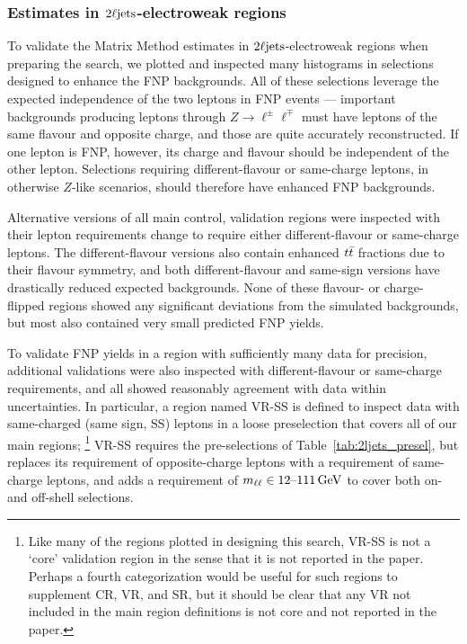 \subsubsection{%
Estimates in \texorpdfstring{$\twoljets$}{2Ljets}-electroweak regions%
}
\label{sec:2ljets_matrix_method_ewk}
To validate the Matrix Method estimates in $\twoljets$-electroweak regions
when preparing the search, we plotted and inspected many histograms in
selections designed to enhance the FNP backgrounds.
All of these selections leverage the expected independence of the two leptons
in FNP events --- important backgrounds producing leptons through
$Z\to \ell^\pm\ell^\mp$ must have leptons of the same flavour and
opposite charge, and those are quite accurately reconstructed.
If one lepton is FNP, however, its charge and flavour should be
independent of the other lepton.
Selections requiring different-flavour or same-charge leptons,
in otherwise $Z$-like scenarios, should therefore have enhanced FNP
backgrounds.

Alternative versions of all main control, validation regions were inspected
with their lepton requirements change to require either different-flavour
or same-charge leptons.
The different-flavour versions also contain enhanced $\ttbar$ fractions
due to their flavour symmetry,
and both different-flavour and same-sign versions have drastically reduced
expected backgrounds.
None of these flavour- or charge- flipped regions showed any significant
deviations from the simulated backgrounds, but most also contained very small
predicted FNP yields.

To validate FNP yields in a region with sufficiently many data for precision,
additional validations were also inspected with different-flavour or
same-charge requirements, and all showed reasonably agreement with data
within uncertainties.
In particular, a region named VR-SS is defined to inspect data with
same-charged (same sign, SS) leptons in a loose preselection that covers all
of our main regions;%
\footnote{%
Like many of the regions plotted in designing this search, VR-SS is not a
`core' validation region in the sense that it is not reported in the paper.
Perhaps a fourth categorization would be useful for such regions to supplement
CR, VR, and SR, but it should be clear that any VR not included in the main
region definitions is not core and not reported in the paper.
}
VR-SS requires the pre-selections of Table~\ref{tab:2ljets_presel},
but replaces its requirement of opposite-charge leptons with a requirement of
same-charge leptons, and adds a requirement of $\mll \in 12\textrm{--}111\,\eV[G]$
to cover both on- and off-shell selections.

